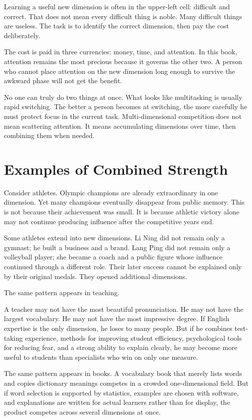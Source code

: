 Learning a useful new dimension is often in the upper-left cell: difficult and correct. That does not mean every difficult thing is noble. Many difficult things are useless. The task is to identify the correct dimension, then pay the cost deliberately.

The cost is paid in three currencies: money, time, and attention. In this book, attention remains the most precious because it governs the other two. A person who cannot place attention on the new dimension long enough to survive the awkward phase will not get the benefit.

No one can truly do two things at once. What looks like multitasking is usually rapid switching. The better a person becomes at switching, the more carefully he must protect focus in the current task. Multi-dimensional competition does not mean scattering attention. It means accumulating dimensions over time, then combining them when needed.

\section*{Examples of Combined Strength}

Consider athletes. Olympic champions are already extraordinary in one dimension. Yet many champions eventually disappear from public memory. This is not because their achievement was small. It is because athletic victory alone may not continue producing influence after the competitive years end.

Some athletes extend into new dimensions. Li Ning did not remain only a gymnast; he built a business and a brand. Lang Ping did not remain only a volleyball player; she became a coach and a public figure whose influence continued through a different role. Their later success cannot be explained only by their original medals. They opened additional dimensions.

The same pattern appears in teaching.

A teacher may not have the most beautiful pronunciation. He may not have the largest vocabulary. He may not have the most impressive degree. If English expertise is the only dimension, he loses to many people. But if he combines test-taking experience, methods for improving student efficiency, psychological tools for reducing fear, and a strong ability to explain clearly, he may become more useful to students than specialists who win on only one measure.

The same pattern appears in books. A vocabulary book that merely lists words and copies dictionary meanings competes in a crowded one-dimensional field. But if word selection is supported by statistics, examples are chosen with software, and explanations are written for actual learners rather than for display, the product competes across several dimensions at once.

